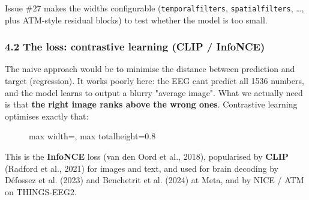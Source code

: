 \documentclass[
  11pt,
]{article}
\renewcommand{\_}{\oldunderscore\allowbreak}
\begin{document}
Issue \#27 makes the widths configurable
(\texttt{temporal\_filters},
\texttt{spatial\_filters}, \ldots, plus
ATM-style residual blocks) to test
whether the model is too small.

\subsubsection{4.2 The loss: contrastive
learning (CLIP /
InfoNCE)}\label{the-loss-contrastive-learning-clip-infonce}

The naive approach would be to minimise
the distance between prediction and
target (regression). It works poorly
here: the EEG can\textquotesingle t
predict all 1536 numbers, and the model
learns to output a blurry "average
image". What we actually need is that
\textbf{the right image ranks above the
wrong ones}. Contrastive learning
optimises exactly that:

\begin{figure}[H]\centering
\begin{adjustbox}{max width=\linewidth, max totalheight=0.8\textheight}
\end{adjustbox}
\end{figure}

This is the \textbf{InfoNCE} loss (van
den Oord et al., 2018), popularised by
\textbf{CLIP} (Radford et al., 2021) for
images and text, and used for brain
decoding by Défossez et al. (2023) and
Benchetrit et al. (2024) at Meta, and by
NICE / ATM on THINGS-EEG2.
\end{document}
